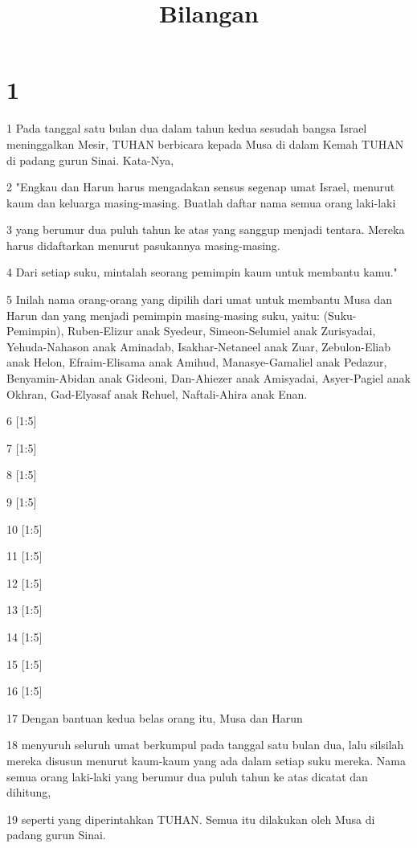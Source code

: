 

\title{Bilangan}


\chapter{1}

\par 1 Pada tanggal satu bulan dua dalam tahun kedua sesudah bangsa Israel meninggalkan Mesir, TUHAN berbicara kepada Musa di dalam Kemah TUHAN di padang gurun Sinai. Kata-Nya,
\par 2 "Engkau dan Harun harus mengadakan sensus segenap umat Israel, menurut kaum dan keluarga masing-masing. Buatlah daftar nama semua orang laki-laki
\par 3 yang berumur dua puluh tahun ke atas yang sanggup menjadi tentara. Mereka harus didaftarkan menurut pasukannya masing-masing.
\par 4 Dari setiap suku, mintalah seorang pemimpin kaum untuk membantu kamu."
\par 5 Inilah nama orang-orang yang dipilih dari umat untuk membantu Musa dan Harun dan yang menjadi pemimpin masing-masing suku, yaitu: (Suku-Pemimpin), Ruben-Elizur anak Syedeur, Simeon-Selumiel anak Zurisyadai, Yehuda-Nahason anak Aminadab, Isakhar-Netaneel anak Zuar, Zebulon-Eliab anak Helon, Efraim-Elisama anak Amihud, Manasye-Gamaliel anak Pedazur, Benyamin-Abidan anak Gideoni, Dan-Ahiezer anak Amisyadai, Asyer-Pagiel anak Okhran, Gad-Elyasaf anak Rehuel, Naftali-Ahira anak Enan.
\par 6 [1:5]
\par 7 [1:5]
\par 8 [1:5]
\par 9 [1:5]
\par 10 [1:5]
\par 11 [1:5]
\par 12 [1:5]
\par 13 [1:5]
\par 14 [1:5]
\par 15 [1:5]
\par 16 [1:5]
\par 17 Dengan bantuan kedua belas orang itu, Musa dan Harun
\par 18 menyuruh seluruh umat berkumpul pada tanggal satu bulan dua, lalu silsilah mereka disusun menurut kaum-kaum yang ada dalam setiap suku mereka. Nama semua orang laki-laki yang berumur dua puluh tahun ke atas dicatat dan dihitung,
\par 19 seperti yang diperintahkan TUHAN. Semua itu dilakukan oleh Musa di padang gurun Sinai.
